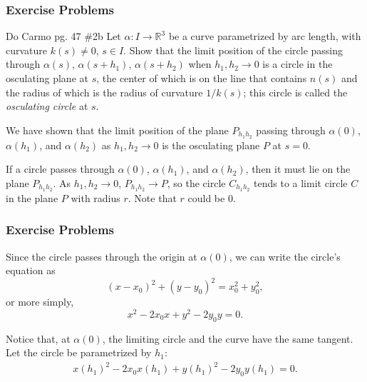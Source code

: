 \documentclass[handout]{beamer}
\theoremstyle{definition}
\theoremstyle{remark}
\newcommand{\R}{\mathbb{R}}
\renewcommand{\=}{&=&}
\newcommand{\<}{\langle}
\renewcommand{\>}{\rangle}
\begin{document}
\begin{frame}[t]
\frametitle{Exercise Problems}
\begin{block}{Do Carmo pg. 47 \#2b}
Let $\alpha : I \to \R^3$ be a curve parametrized by arc length, with curvature $k(s) \ne 0$,
$s \in I$. Show that the limit position of the circle passing through $\alpha(s)$, $\alpha(s+h_1)$,
$\alpha(s+h_2)$ when $h_1,h_2 \to 0$ is a circle in the osculating plane at $s$, the center of
which is on the line that contains $n(s)$ and the radius of which is the radius of curvature
$1/k(s)$; this circle is called the \emph{osculating circle} at $s$.
\end{block}
\pause
\begin{solution}
We have shown that the limit position of the plane $P_{h_1 h_2}$ passing through $\alpha(0)$,
$\alpha(h_1)$, and $\alpha(h_2)$ as $h_1,h_2 \to 0$ is the osculating plane $P$ at $s=0$. 
\pause\vspace{3mm}

If a circle passes through $\alpha(0)$, $\alpha(h_1)$, and $\alpha(h_2)$, then it must lie on the 
plane $P_{h_1 h_2}$. As $h_1, h_2 \to 0$, $P_{h_1 h_2} \to P$, so the circle $C_{h_1 h_2}$
tends to a limit circle $C$ in the plane $P$ with radius $r$. Note that $r$ could be 0.
\end{solution}
\end{frame}

\begin{frame}[t]
\frametitle{Exercise Problems}
\begin{solution}
Since the circle passes through the origin at $\alpha(0)$, we can write the circle's equation as
\[
	(x-x_0)^2 + (y-y_0)^2 = x_0^2 + y_0^2,
\]
or more simply,
\[
	x^2 - 2 x_0 x + y^2 - 2 y_0 y = 0.
\]
\pause \vspace{3mm}

Notice that, at $\alpha(0)$, the limiting circle and the curve have the same tangent. Let the circle
be parametrized by $h_1$:
\begin{align}
\label{param}
x(h_1)^2 - 2x_0 x(h_1) + y(h_1)^2 - 2y_0 y(h_1) = 0.
\end{align}
\end{solution}
\end{frame}
\end{document}
